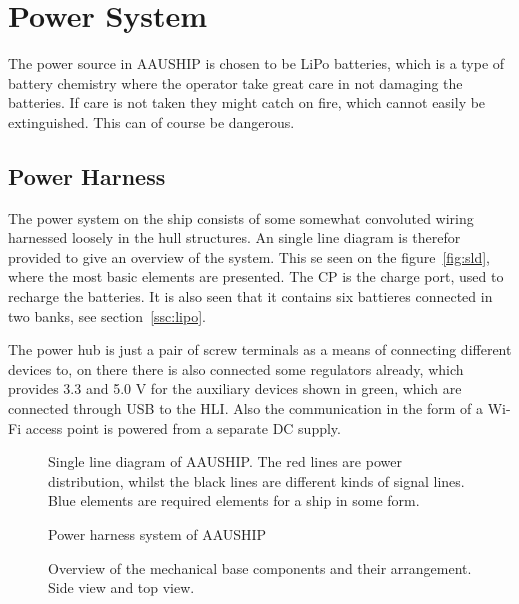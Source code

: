 \section{Power System}

The power source in AAUSHIP is chosen to be LiPo batteries, which is
a type of battery chemistry where the operator take great care in not damaging
the batteries. If care is not taken they might catch on fire, which
cannot easily be extinguished. This can of course be dangerous.

\subsection{Power Harness}
The power system on the ship consists of some somewhat convoluted
wiring harnessed loosely in the hull structures. An single line
diagram is therefor provided to give an overview of the system. This
se seen on the figure~\vref{fig:sld}, where the most basic elements
are presented. The CP is the charge port, used to recharge the
batteries. It is also seen that it contains six battieres connected in
two banks, see section~\vref{ssc:lipo}.

The power hub is just a pair of screw terminals as a means of
connecting different devices to, on there there is also connected some
regulators already, which provides 3.3 and 5.0 V for the auxiliary
devices shown in green, which are connected through USB to the
\ac{HLI}. Also the communication in the form of a Wi-Fi access point is
powered from a separate DC supply.

\begin{figure}[htbp]
	
	\caption{Single line diagram of AAUSHIP. The red lines are power
	distribution, whilst the black lines are different kinds of signal
lines. Blue elements are required elements for a ship in some form.}
	\label{fig:sld}
\end{figure}


\begin{figure}[htbp]
	
	\caption{Power harness system of AAUSHIP}
	\label{fig:harness}
\end{figure}

\begin{figure}[htbp]
	
	\caption{Overview of the mechanical base components and their
	arrangement. Side view and top view.}
	\label{fig:mechanical}
\end{figure}


